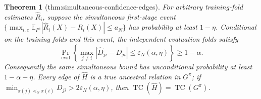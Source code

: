 \documentclass{article}
\newtheorem{theorem}{Theorem}
\begin{document}
\begin{theorem}[thm:simultaneous-confidence-edges]\label{thm:simultaneous-confidence-edges}
For arbitrary training-fold estimates \(\widehat R_i\), suppose the simultaneous first-stage event \(\{\max_{i,e}\mathbb E_{P^e}|\widehat R_i(X)-R_i(X)|\le a_N\}\) has probability at least \(1-\eta\). Conditional on the training folds and this event, the independent evaluation folds satisfy \[\Pr_{\mathrm{eval}}\!\left\{\max_{j\ne i}|\widehat D_{ji}-D_{ji}|\le\varepsilon_N(\alpha,\eta)\right\}\ge1-\alpha.\] Consequently the same simultaneous bound has unconditional probability at least \(1-\alpha-\eta\). Every edge of \(\widehat H\) is a true ancestral relation in \(G^\pi\); if \(\min_{\pi(j)\lessdot_G\pi(i)}D_{ji}>2\varepsilon_N(\alpha,\eta)\), then \(\operatorname{TC}(\widehat H)=\operatorname{TC}(G^\pi)\).
\end{theorem}
\end{document}
